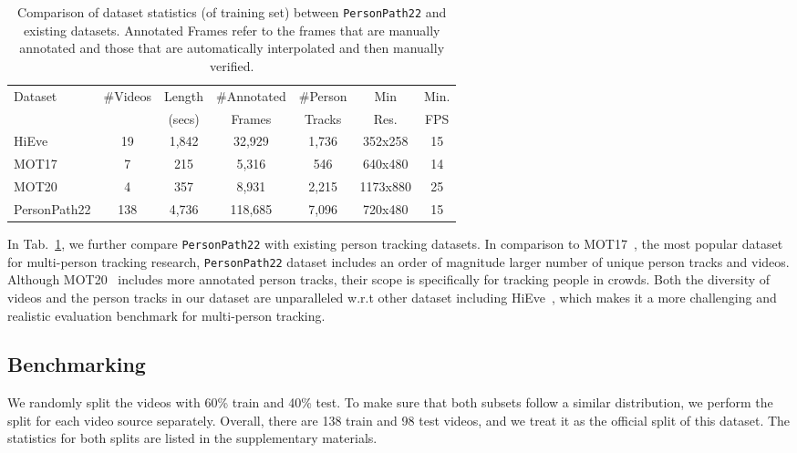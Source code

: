 \documentclass[runningheads]{llncs}
\begin{document}
\begin{table}[t]
    \centering
    \begin{tabular}{lcccccc}
    \toprule
         \multirow{2}{*}{Dataset} & \#Videos & Length & \#Annotated & \#Person & Min & Min.  \\
         &  & (secs) & Frames  & Tracks & Res. & FPS \\
         \midrule
HiEve\cite{hieve} & 19 & 1,842 & 32,929  & 1,736 & 352x258  & 15 \\
         MOT17\cite{mot} & 7 & 215  & 5,316   & 546 & 640x480 & 14 \\
         MOT20\cite{mot20} & 4 & 357  & 8,931   & 2,215 & 1173x880 & 25\\
         PersonPath22 & 138 & 4,736 &  118,685 & 7,096 & 720x480& 15 \\
    \bottomrule
    \end{tabular}
    \caption{ \small Comparison of dataset statistics (of training set) between \texttt{PersonPath22} and existing datasets. Annotated Frames refer to the frames that are manually annotated and those that are automatically interpolated and then manually verified.
}
    
    \label{tab:comparison}
\end{table}

In Tab.~\ref{tab:comparison}, we further compare \texttt{PersonPath22} with existing person tracking datasets. In comparison to MOT17~\cite{mot}, the most popular dataset for multi-person tracking research, \texttt{PersonPath22} dataset includes an order of magnitude larger number of unique person tracks and videos. 
Although MOT20~\cite{mot20} includes more annotated person tracks, their scope is specifically for tracking people in crowds.
Both the diversity of videos and the person tracks in our dataset are unparalleled w.r.t other dataset including HiEve~\cite{hieve}, which makes it a more challenging and realistic evaluation benchmark for multi-person tracking.

\subsection{Benchmarking} \label{sec:benchmark}
We randomly split the videos with 60\% train and 40\% test. 
To make sure that both subsets follow a similar distribution, we perform the split for each video source separately. Overall, there are 138 train and 98 test videos, and we treat it as the official split of this dataset. The statistics for both splits are listed in the supplementary materials.
\end{document}
